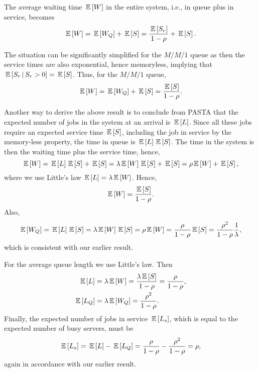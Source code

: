 The average waiting time $\E W$ in the entire system, i.e., in queue
plus in service, becomes
\begin{equation*}
  \E W = \E{W_Q}+ \E S = \frac{\E{S_r}}{1-\rho} + \E S.
\end{equation*}

The situation can be significantly simplified for the $M/M/1$ queue as
then the service times are also exponential, hence memoryless,
implying that $\E{S_r\given S_r>0} = \E S$. Thus, for the $M/M/1$ queue,
\begin{equation*}
  \E W = \E{W_Q}+ \E S = \frac{\E S}{1-\rho}.
\end{equation*}


Another way to derive the above result is to conclude from PASTA that
the expected number of jobs in the system at an arrival is $\E{L}$.
Since all these jobs require an expected service time $\E S$,
including the job in service by the memory-less property, the time in
queue is $\E L \E S$. The time in the system is then the waiting time
plus the service time, hence,
\begin{equation}\label{eq:61}
  \E W = \E L  \E S + \E S = \lambda \E W \E S + \E S = \rho \E W  + \E S,
\end{equation}
where we use Little's law $\E L = \lambda \E W$.  Hence,
\begin{equation*}
\E W = \frac{\E S}{1-\rho}.
\end{equation*}
Also,
\begin{equation}\label{eq:wqes}
  \E{W_Q} = \E L \E S = \lambda \E W \E S= \rho \E W = \frac{\rho}{1-\rho} \E S = \frac{\rho^2}{1-\rho} \frac 1 \lambda,
\end{equation}
which is consistent with our earlier result.  

For the average queue length we use Little's law. Then
\begin{equation*}
  \begin{split}
\E L &= \lambda \E W = \frac{\lambda \E S}{1-\rho} = \frac\rho{1-\rho}, \\
  \E{L_Q} &= \lambda \E{W_Q} = \frac{\rho^2}{1-\rho}.
      \end{split}
\end{equation*}
Finally, the expected number of jobs in service $\E{L_s}$, which is
equal to the expected number of busy servers, must be
\begin{equation*}
  \E{L_s} = \E L - \E{L_Q} = \frac{\rho}{1-\rho} - \frac{\rho^2}{1-\rho} = \rho, 
\end{equation*}
again in accordance with our earlier result.

